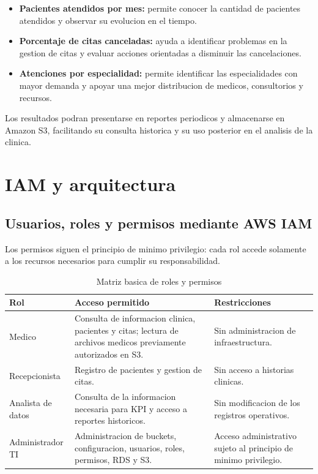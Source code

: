 \documentclass[11pt,letterpaper]{article}
\begin{document}
\begin{itemize}
  \item \textbf{Pacientes atendidos por mes:}
  permite conocer la cantidad de pacientes atendidos y observar su evolucion en el tiempo.

  \item \textbf{Porcentaje de citas canceladas:}
  ayuda a identificar problemas en la gestion de citas y evaluar acciones orientadas a disminuir
  las cancelaciones.

  \item \textbf{Atenciones por especialidad:}
  permite identificar las especialidades con mayor demanda y apoyar una mejor distribucion de
  medicos, consultorios y recursos.
\end{itemize}

Los resultados podran presentarse en reportes periodicos y almacenarse en Amazon S3, facilitando
su consulta historica y su uso posterior en el analisis de la clinica.

\section{IAM y arquitectura}

\subsection{Usuarios, roles y permisos mediante AWS IAM}

Los permisos siguen el principio de minimo privilegio: cada rol accede solamente a los recursos
necesarios para cumplir su responsabilidad.

\begin{table}[htbp]
  \centering
  \small
  \caption{Matriz basica de roles y permisos}

  \begin{tabularx}{\textwidth}{@{}p{3.1cm}Y Y@{}}
    \toprule
    \textbf{Rol} & \textbf{Acceso permitido} & \textbf{Restricciones} \\
    \midrule

    Medico &
    Consulta de informacion clinica, pacientes y citas; lectura de archivos medicos previamente
    autorizados en S3. &
    Sin administracion de infraestructura. \\

    Recepcionista &
    Registro de pacientes y gestion de citas. &
    Sin acceso a historias clinicas. \\

    Analista de datos &
    Consulta de la informacion necesaria para KPI y acceso a reportes historicos. &
    Sin modificacion de los registros operativos. \\

    Administrador TI &
    Administracion de buckets, configuracion, usuarios, roles, permisos, RDS y S3. &
    Acceso administrativo sujeto al principio de minimo privilegio. \\

    \bottomrule
  \end{tabularx}
\end{table}
\end{document}
